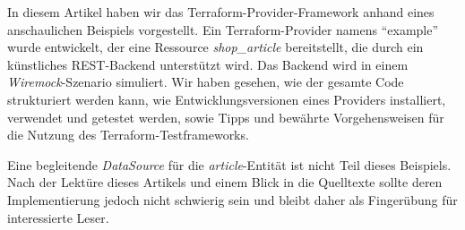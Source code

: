 \documentclass[paper=a4,11pt,numbers=noenddot]{article}
\begin{document}
In diesem Artikel haben wir das Terraform-Provider-Framework anhand eines anschaulichen Beispiels vorgestellt. Ein Terraform-Provider namens ``example'' wurde entwickelt, der eine Ressource \emph{shop\_article} bereitstellt, die durch ein künstliches REST-Backend unterstützt wird. Das Backend wird in einem \emph{Wiremock}-Szenario simuliert. Wir haben gesehen, wie der gesamte Code strukturiert werden kann, wie Entwicklungsversionen eines Providers installiert, verwendet und getestet werden, sowie Tipps und bewährte Vorgehensweisen für die Nutzung des Terraform-Testframeworks.

Eine begleitende \emph{DataSource} für die \emph{article}-Entität ist nicht Teil dieses Beispiels. Nach der Lektüre dieses Artikels und einem Blick in die Quelltexte sollte deren Implementierung jedoch nicht schwierig sein und bleibt daher als Fingerübung für interessierte Leser.

\printbibliography[heading=bibintoc]
\end{document}
